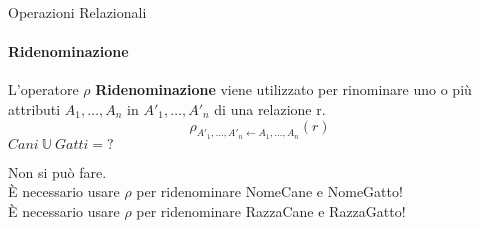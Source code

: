     \begin{frame}{Operazioni Relazionali}
        \framesubtitle{Ridenominazione}
        L'operatore $\rho$ \textbf{Ridenominazione} viene utilizzato per rinominare uno o pi\`u attributi $A_1,\dotsc,A_n$ in $A'_1,\dotsc,A'_n$ di una relazione r.
        \[\rho_{A'_1,\dotsc,A'_n \leftarrow A_1,\dotsc,A_n} (r)\]
        \vspace*{0.2cm}
         \centering $Cani~\mathbb{U}~Gatti = ?$
    
         \centering Non si pu\`o fare.\\ \`E necessario usare $\rho$ per ridenominare NomeCane e NomeGatto! \\\`E necessario usare $\rho$ per ridenominare RazzaCane e RazzaGatto!
    \end{frame}
